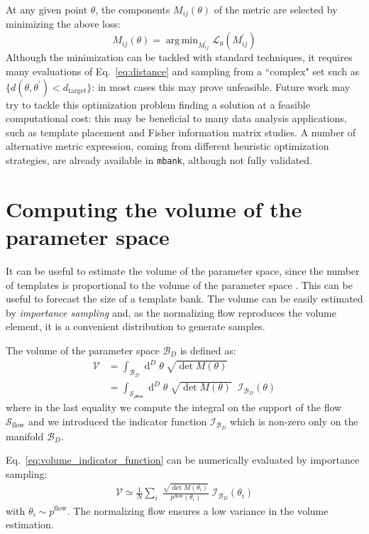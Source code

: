 \documentclass[twocolumn,showpacs,preprintnumbers,nofootinbib,prd,
superscriptaddress,10pt]{revtex4-2}
\newcommand{\dvol}[2]{\ensuremath{\operatorname{d}^{#2}\!{#1}}}
\DeclareMathOperator*{\argmin}{arg\,min}
\begin{document}
At any given point $\theta$, the components $M_{ij}(\theta)$ of the metric are selected by minimizing the above loss:
\begin{equation} \label{eq:metric_optmization}
	M_{ij}(\theta) = \argmin_{M^\prime_{ij}}  \mathcal{L}_\theta(M^\prime_{ij})
\end{equation}
Although the minimization can be tackled with standard techniques, it requires many evaluations of Eq.~\eqref{eq:distance} and sampling from a ``complex" set such as ${\{d(\theta,\theta^\prime) < d_\mathrm{target}\}}$: in most cases this may prove unfeasible.
Future work may try to tackle this optimization problem finding a solution at a feasible computational cost: this may be beneficial to many data analysis applications, such as template placement and Fisher information matrix studies.
A number of alternative metric expression, coming from different heuristic optimization strategies, are already available in \texttt{mbank}, although not fully validated.


\section{Computing the volume of the parameter space}\label{app:parameter_space_volume}

It can be useful to estimate the volume of the parameter space, since the number of templates is proportional to the volume of the parameter space \cite{owen_metric}. This can be useful to forecast the size of a template bank.
The volume can be easily estimated by {\it importance sampling} and, as the normalizing flow reproduces the volume element, it is a convenient distribution to generate samples.

The volume of the parameter space $\mathcal{B}_D$ is defined as:
\begin{align}
	\mathcal{V} & = \int_\mathcal{\mathcal{B}_D} \dvol{\theta}{D} \; \sqrt{\det M(\theta)} \\
				& = \int_\mathcal{\mathcal{S}_\text{flow}} \dvol{\theta}{D} \; \sqrt{\det M(\theta)} \;\; \mathcal{I}_{\mathcal{B}_D}(\theta) \label{eq:volume_indicator_function}
\end{align}
where in the last equality we compute the integral on the support of the flow $\mathcal{S}_\text{flow}$ and we introduced the indicator function $\mathcal{I}_{\mathcal{B}_D}$ which is non-zero only on the manifold $\mathcal{B}_D$.

Eq.~\eqref{eq:volume_indicator_function} can be numerically evaluated by importance sampling:
%
\begin{align}\label{eq:vol_IS}
	\mathcal{V} \simeq \frac{1}{N} \sum_i \; \frac{\sqrt{\det M(\theta_i)}}{p^\text{flow}(\theta_i)} \; \mathcal{I}_{\mathcal{B}_D}(\theta_i)
\end{align}
with  $\theta_i \sim p^\text{flow}$.
The normalizing flow ensures a low variance in the volume estimation.
\end{document}
